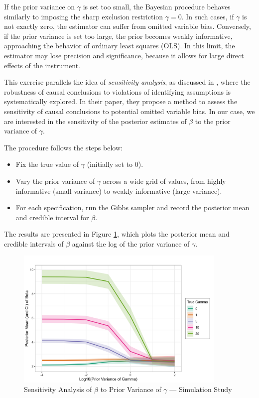 If the prior variance on $\gamma$ is set too small, the Bayesian procedure behaves similarly to imposing the sharp exclusion restriction $\gamma = 0$. In such cases, if $\gamma$ is not exactly zero, the estimator can suffer from omitted variable bias. Conversely, if the prior variance is set too large, the prior becomes weakly informative, approaching the behavior of ordinary least squares (OLS). In this limit, the estimator may lose precision and significance, because it allows for large direct effects of the instrument.

This exercise parallels the idea of \emph{sensitivity analysis}, as discussed in \cite{cinelliMakingSenseSensitivity2020}, where the robustness of causal conclusions to violations of identifying assumptions is systematically explored. In their paper, they propose a method to assess the sensitivity of causal conclusions to potential omitted variable bias. In our case, we are interested in the sensitivity of the posterior estimates of $\beta$ to the prior variance of $\gamma$.

The procedure follows the steps below:
\begin{itemize}
    \item Fix the true value of $\gamma$ (initially set to 0).
    \item Vary the prior variance of $\gamma$ across a wide grid of values, from highly informative (small variance) to weakly informative (large variance).
    \item For each specification, run the Gibbs sampler and record the posterior mean and credible interval for $\beta$.
\end{itemize}

The results are presented in Figure \ref{fig:sensitivity_analysis_beta}, which plots the posterior mean and credible intervals of $\beta$ against the log of the prior variance of $\gamma$.

\begin{figure}[H]
\centering
\includegraphics[width=0.9\textwidth]{../figures/simulation/plot_prior_gamma.png}
\caption{Sensitivity Analysis of $\widehat{\beta}$ to Prior Variance of $\gamma$ --- Simulation Study}
\label{fig:sensitivity_analysis_beta}
\end{figure}


